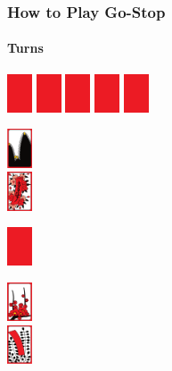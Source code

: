 \begin{frame}[fragile]
  \frametitle{How to Play Go-Stop}
  \framesubtitle{Turns}

  \begin{center}
    \parbox{\textwidth}{
      \centering
      \includegraphics[width=2em]{images/cards/hidden}
      \includegraphics[width=2em]{images/cards/hidden}
      \includegraphics[width=2em]{images/cards/hidden}
      \includegraphics[width=2em]{images/cards/hidden}
      \includegraphics[width=2em]{images/cards/hidden}
    }

    \vspace*{1.5em}

    \parbox{\textwidth}{
      \centering
      \parbox{2em}{
        \includegraphics[width=2em]{images/cards/J011}\\
        \includegraphics[width=2em]{images/cards/R03}%
      }
      \quad
      \parbox{2em}{%
        \vspace*{0em}%
        \includegraphics[width=2em]{images/cards/hidden}
      }
      \quad
      \parbox{2em}{
        \includegraphics[width=2em]{images/cards/J020}\\
        \includegraphics[width=2em]{images/cards/R04}
      }
    }


\end{center}
\end{frame}

